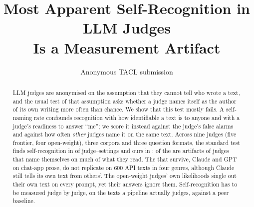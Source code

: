 \documentclass[11pt,a4paper]{article}
\title{Most Apparent Self-Recognition in LLM Judges\\
Is a Measurement Artifact}
\author{Anonymous TACL submission}
\date{}
\begin{document}
\maketitle

\begin{abstract}
LLM judges are anonymised on the assumption that they cannot tell who wrote
a text, and the usual test of that assumption asks whether a judge names
itself as the author of its own writing more often than chance. We show that
this test mostly fails. A self-naming rate confounds recognition with how
identifiable a text is to anyone and with a judge's readiness to answer
``me''; we score it instead against the judge's false alarms and against how
often \emph{other} judges name it on the same text. Across nine judges (five
frontier, four open-weight), three corpora and three question formats, the
standard test finds self-recognition in \SVPStd{} of \SVPCells{}
judge--settings and ours in \SVPProper{}: \SVPFalse{} of the \SVPStd{} are
artifacts of judges that name themselves on much of what they read. The
\SVPProper{} that survive, Claude and GPT on chat-app prose, do not replicate
on 600 API texts in four genres, although Claude still tells its own text
from others'. The open-weight judges' own likelihoods single out their own
text on every prompt, yet their answers ignore them. Self-recognition has to
be measured judge by judge, on the texts a pipeline actually judges, against
a peer baseline.
\end{abstract}












\appendix

\end{document}
